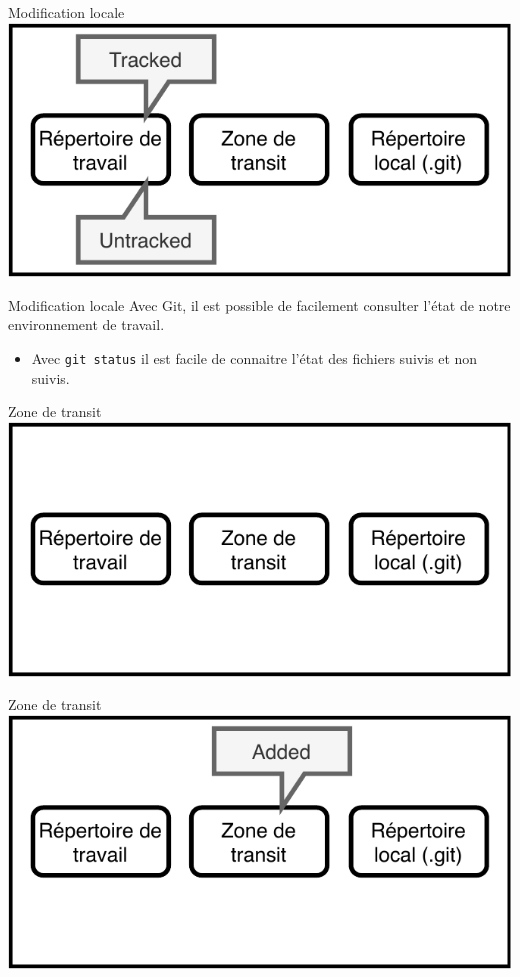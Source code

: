 \documentclass[11pt]{beamer}
\begin{document}
\begin{frame}{Modification locale}
	\includegraphics[width=0.95\linewidth,height=0.95\textheight,keepaspectratio]{modif.pdf}
\end{frame}

\begin{frame}[fragile]{Modification locale}
	Avec Git, il est possible de facilement consulter l'état de notre environnement de travail. 
	\begin{itemize}
		\item Avec \verb|git status| il est facile de connaitre l'état des fichiers suivis et non suivis.
	\end{itemize}
\end{frame}

\begin{frame}{Zone de transit}
	\includegraphics[width=0.95\linewidth,height=0.95\textheight,keepaspectratio]{stage.pdf}
\end{frame}

\begin{frame}{Zone de transit}
	\includegraphics[width=0.95\linewidth,height=0.95\textheight,keepaspectratio]{added.pdf}
\end{frame}
\end{document}
